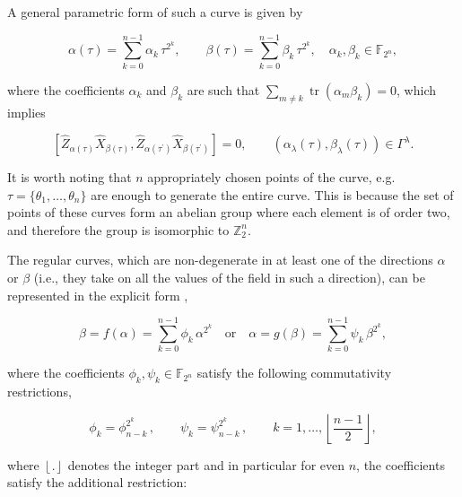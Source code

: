 \documentclass[quantumrep,article,submit,pdftex,moreauthors]{Definitions/mdpi}
\DeclareMathOperator{\tr}{tr}
\providecommand{\DIFaddbegin}{} %
\providecommand{\DIFaddend}{} %
\providecommand{\DIFdelbegin}{} %
\providecommand{\DIFdelend}{} %
\begin{document}
A general parametric form of such a curve is given by

\begin{equation}
  \alpha (\tau)
  = \sum_{k=0}^{n-1}\alpha_{k}\,\tau^{2^{k}}, \qquad \beta(\tau)
  = \sum_{k=0}^{n-1}\beta_{k} \, \tau^{2^{k}},
  \quad \alpha_{k},\beta_{k}\in \mathbb{F}_{2^{n}},
  \label{curve1a}
\end{equation}

where the coefficients $\alpha_k$ and $\beta_k$ are such that $\sum_{m \neq k}
\tr(\alpha_{m}\beta_{k})=0$, which implies

\begin{equation}
  \DIFdelbegin %
\DIFdelend \DIFaddbegin \left[
    \DIFaddend \hat{Z}_{\alpha(\tau)}\hat{X}_{\beta(\tau)},
    \hat{Z}_{\alpha(\tau^{\prime})} \hat{X}_{\beta(\tau^{\prime})}
  \DIFdelbegin %
\DIFdelend \DIFaddbegin \right] \DIFaddend = 0,
  \qquad \left( \alpha_{\lambda}(\tau),\beta_{\lambda}(\tau) \right)
  \in \Gamma^{\lambda }.
  \label{stab}
\end{equation}

It is worth noting that $n$ appropriately chosen points of the curve, e.g.
$\tau=\{\theta_{1},\ldots,\theta_{n}\}$ are enough to generate the entire curve.
This is because the set of points of these curves form an abelian group where
each element is of order two, and therefore the group is isomorphic to
$\mathbb{Z}_{2}^n$.

The regular curves, which are non-degenerate in at least one of the directions
$\alpha$ or $\beta$ (i.e., they take on all the values of the field in such a
direction), can be represented in the explicit form \cite{GS2},

\begin{equation}
  \beta = f(\alpha)
  = \sum_{k=0}^{n-1} \phi_{k} \, \alpha^{2^{k}}
  \quad \text{or} \quad
  \alpha = g(\beta) = \sum_{k=0}^{n-1} \psi_{k}\,\beta^{2^{k}},
  \label{RC}
\end{equation}

where the coefficients $\phi_{k},\psi_{k} \in \mathbb{F}_{2^{n}}$ satisfy the
following commutativity restrictions,

\begin{equation}
  \phi_{k} = \phi_{n-k}^{2^{k}}\,,
  \qquad \psi_{k} = \psi_{n-k}^{2^{k}}\,,
  \qquad k=1,\ldots, \left\lfloor \frac{n-1}{2}\right\rfloor,
  \label{Acc}
\end{equation}

where $\left\lfloor . \right\rfloor$ denotes the integer part and in particular
for even $n$, the coefficients satisfy the additional restriction: 
\end{document}
